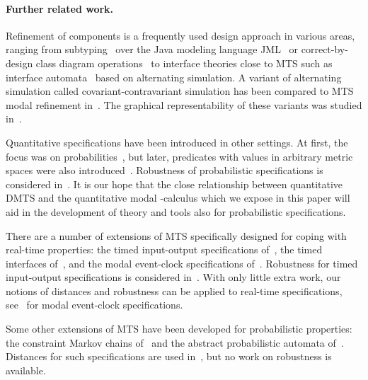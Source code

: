 \documentclass[twocolumn]{svjour3-dummy}
\begin{document}
\paragraph{Further related work.}

Refinement of components is a frequently used design approach in various
areas, ranging from subtyping~\cite{DBLP:journals/toplas/LiskovW94} over
the Java modeling language JML~\cite{DBLP:conf/fase/JacobsP01} or
correct-by-design class diagram
operations~\cite{DBLP:conf/fase/FahrenbergALW14} to interface theories
close to MTS such as interface
automata~\cite{DBLP:conf/sigsoft/AlfaroH01} based on alternating
simulation. A variant of alternating simulation called
cova\-riant-contravariant simulation has been compared to MTS modal
refinement in~\cite{DBLP:journals/scp/AcetoFFIP13}. The graphical
representability of these variants was studied
in~\cite{DBLP:journals/tcs/BoudolL92, DBLP:conf/concur/BenesDFKL13}.

Quantitative specifications have been introduced in other settings.  At
first, the focus was on probabilities~\cite{DBLP:conf/lics/HuthK97, mu2,
  DBLP:conf/fossacs/Mio11}, but later, predicates with values in
arbitrary metric spaces were also
introduced~\cite{DBLP:journals/tse/AlfaroFS09}.  Robustness of
probabilistic specifications is considered
in~\cite{DBLP:journals/tcs/AlfaroFHMS05, DBLP:journals/tse/AlfaroFS09,
  DBLP:conf/concur/Alfaro03}.  It is our hope that the close
relationship between quantitative DMTS and the quantitative modal
-calculus which we expose in this paper will aid in the development
of theory and tools also for probabilistic specifications.

There are a number of extensions of MTS specifically designed for
coping with real-time properties: the timed input-output
specifications of~\cite{DBLP:journals/sttt/DavidLLNTW15}, the timed
interfaces of~\cite{DBLP:conf/emsoft/AlfaroHS02}, and the modal
event-clock specifications of~\cite{DBLP:journals/scp/BertrandLPR12}.
Robustness for timed input-output specifications is considered
in~\cite{DBLP:journals/tcs/LarsenLTW14,
  DBLP:journals/corr/abs-1207-4269, DBLP:conf/formats/LarsenLTW11}.
With only little extra work, our notions of distances and robustness
can be applied to real-time specifications,
see~\cite{DBLP:journals/corr/abs-1207-4268} for modal event-clock
specifications.

Some other extensions of MTS have been developed for probabilistic
properties: the constraint Markov chains
of~\cite{DBLP:journals/jlp/DelahayeLLPW12,
  DBLP:journals/tcs/CaillaudDLLPW11,
  DBLP:conf/lics/JonssonL91} and the abstract probabilistic automata
of~\cite{DBLP:journals/tcs/CaillaudDLLPW11}.  Distances for such
specifications are used in~\cite{DBLP:journals/corr/abs-1212-4288}, but
no work on robustness is available.
\end{document}
